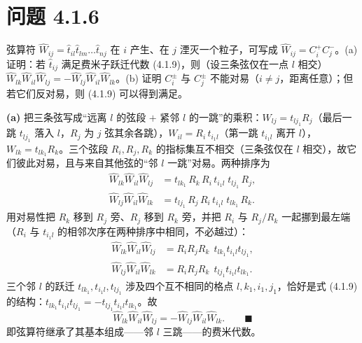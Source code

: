 \section*{问题 4.1.6}
\begin{problem}
弦算符 $\hat W_{ij}=\hat t_{il}\hat t_{lm}\ldots\hat t_{nj}$ 在 $i$ 产生、在 $j$ 湮灭一个粒子，可写成 $\hat W_{ij}=C^+_iC^-_j$。(a) 证明：若 $\hat t_{ij}$ 满足费米子跃迁代数 (4.1.9)，则（设三条弦仅在一点 $l$ 相交）$\hat W_{lk}\hat W_{il}\hat W_{lj}=-\hat W_{lj}\hat W_{il}\hat W_{lk}$。(b) 证明 $C^\pm_i$ 与 $C^\pm_j$ 不能对易（$i\ne j$，距离任意）；但若它们反对易，则 (4.1.9) 可以得到满足。
\end{problem}
\solution
\textbf{(a)} 把三条弦写成“远离 $l$ 的弦段 $+$ 紧邻 $l$ 的一跳”的乘积：$W_{lj}=t_{lj_1}R_j$（最后一跳 $t_{lj_1}$ 落入 $l$，$R_j$ 为 $j$ 弦其余各跳），$W_{il}=R_i\,t_{i_1l}$（第一跳 $t_{i_1l}$ 离开 $l$），$W_{lk}=t_{lk_1}R_k$。三个弦段 $R_i,R_j,R_k$ 的指标集互不相交（三条弦仅在 $l$ 相交），故它们彼此对易，且与来自其他弦的“邻 $l$ 一跳”对易。两种排序为
\begin{align*}
\hat W_{lk}\hat W_{il}\hat W_{lj}&=t_{lk_1}\,R_k\,R_i\,t_{i_1l}\;t_{lj_1}\,R_j,\\
\hat W_{lj}\hat W_{il}\hat W_{lk}&=t_{lj_1}\,R_j\,R_i\,t_{i_1l}\;t_{lk_1}\,R_k .
\end{align*}
用对易性把 $R_k$ 移到 $R_j$ 旁、$R_j$ 移到 $R_k$ 旁，并把 $R_i$ 与 $R_j/R_k$ 一起挪到最左端（$R_i$ 与 $t_{i_1l}$ 的相邻次序在两种排序中相同，不必越过）：
\begin{align*}
\hat W_{lk}\hat W_{il}\hat W_{lj}&=R_iR_jR_k\;\,t_{lk_1}t_{i_1l}t_{lj_1},\\
\hat W_{lj}\hat W_{il}\hat W_{lk}&=R_iR_jR_k\;\,t_{lj_1}t_{i_1l}t_{lk_1}.
\end{align*}
三个邻 $l$ 的跃迁 $t_{lk_1},t_{i_1l},t_{lj_1}$ 涉及四个互不相同的格点 $l,k_1,i_1,j_1$，恰好是式 (4.1.9) 的结构：$t_{lk_1}t_{i_1l}t_{lj_1}=-t_{lj_1}t_{i_1l}t_{lk_1}$。故
\begin{equation*}
\hat W_{lk}\hat W_{il}\hat W_{lj}=-\hat W_{lj}\hat W_{il}\hat W_{lk}. \qquad\blacksquare
\end{equation*}
即弦算符继承了其基本组成——邻 $l$ 三跳——的费米代数。

